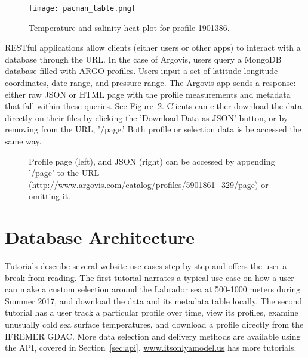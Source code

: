 \begin{figure}[H]
\begin{minipage}{6in}
\centering
\texttt{[image: pacman\_table.png]}
\caption{\label{fig:pacman_table}Temperature and salinity heat plot for profile 1901386.}
\end{minipage}
\end{figure}

RESTful applications allow clients (either users or other apps) to interact with a database through the URL. In the case of Argovis, users query a MongoDB database filled with ARGO profiles. Users input a set of latitude-longitude coordinates, date range, and pressure range. The Argovis app sends a response: either raw JSON or HTML page with the profile measurements and metadata that fall within these queries. See Figure~\ref{fig:profile_data}. Clients can either download the data directly on their files by clicking the 'Download Data as JSON' button, or by removing from the URL, '/page.' Both profile or selection data is be accessed the same way.

\begin{figure}[H]
\begin{minipage}{6in}
\centering
{}
\caption{\label{fig:profile_data} Profile page (left), and JSON (right) can be accessed by appending '/page' to the URL (\url{http://www.argovis.com/catalog/profiles/5901861_329/page}) or omitting it.}
\end{minipage}
\end{figure}

\section{Database Architecture}

Tutorials describe several website use cases step by step and offers the user a break from reading. The first tutorial narrates a typical use case on how a user can make a custom selection around the Labrador sea at 500-1000 meters during Summer 2017, and download the data and its metadata table locally. The second tutorial has a user track a particular profile over time, view its profiles, examine unusually cold sea surface temperatures, and download a profile directly from the IFREMER GDAC. More data selection and delivery methods are available using the API, covered in Section~\ref{sec:api}. \url{www.itsonlyamodel.us} has more tutorials.



